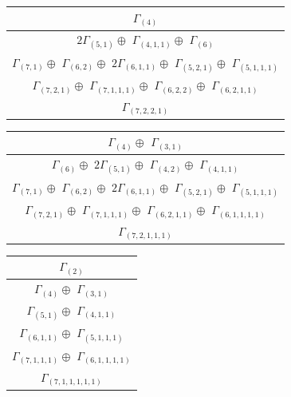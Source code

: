 \documentclass[main.tex]{subfiles}
\begin{document}
\bigskip
\begin{minipage}{.5\textwidth}
\centering
\begin{tabular}{c}
$\Gamma_{(
4
)}$
\\ \hline
$ 2 \Gamma_{(
5 , 
1
)} \oplus$
$\Gamma_{(
4 , 
1 , 
1
)} \oplus$
$\Gamma_{(
6
)}$
\\ \hline
$\Gamma_{(
7 , 
1
)} \oplus$
$\Gamma_{(
6 , 
2
)} \oplus$
$ 2 \Gamma_{(
6 , 
1 , 
1
)} \oplus$
$\Gamma_{(
5 , 
2 , 
1
)} \oplus$
$\Gamma_{(
5 , 
1 , 
1 , 
1
)}$
\\ \hline
$\Gamma_{(
7 , 
2 , 
1
)} \oplus$
$\Gamma_{(
7 , 
1 , 
1 , 
1
)} \oplus$
$\Gamma_{(
6 , 
2 , 
2
)} \oplus$
$\Gamma_{(
6 , 
2 , 
1 , 
1
)}$
\\ \hline
$\Gamma_{(
7 , 
2 , 
2 , 
1
)}$
\\
\end{tabular}\end{minipage}
\begin{minipage}{.5\textwidth}
\centering
\begin{tabular}{c}
$\Gamma_{(
4
)} \oplus$
$\Gamma_{(
3 , 
1
)}$
\\ \hline
$\Gamma_{(
6
)} \oplus$
$ 2 \Gamma_{(
5 , 
1
)} \oplus$
$\Gamma_{(
4 , 
2
)} \oplus$
$\Gamma_{(
4 , 
1 , 
1
)}$
\\ \hline
$\Gamma_{(
7 , 
1
)} \oplus$
$\Gamma_{(
6 , 
2
)} \oplus$
$ 2 \Gamma_{(
6 , 
1 , 
1
)} \oplus$
$\Gamma_{(
5 , 
2 , 
1
)} \oplus$
$\Gamma_{(
5 , 
1 , 
1 , 
1
)}$
\\ \hline
$\Gamma_{(
7 , 
2 , 
1
)} \oplus$
$\Gamma_{(
7 , 
1 , 
1 , 
1
)} \oplus$
$\Gamma_{(
6 , 
2 , 
1 , 
1
)} \oplus$
$\Gamma_{(
6 , 
1 , 
1 , 
1 , 
1
)}$
\\ \hline
$\Gamma_{(
7 , 
2 , 
1 , 
1 , 
1
)}$
\\
\end{tabular}\end{minipage}
\bigskip
\begin{minipage}{.2\textwidth}
\centering
\begin{tabular}{c}
$\Gamma_{(
2
)}$
\\ \hline
$\Gamma_{(
4
)} \oplus$
$\Gamma_{(
3 , 
1
)}$
\\ \hline
$\Gamma_{(
5 , 
1
)} \oplus$
$\Gamma_{(
4 , 
1 , 
1
)}$
\\ \hline
$\Gamma_{(
6 , 
1 , 
1
)} \oplus$
$\Gamma_{(
5 , 
1 , 
1 , 
1
)}$
\\ \hline
$\Gamma_{(
7 , 
1 , 
1 , 
1
)} \oplus$
$\Gamma_{(
6 , 
1 , 
1 , 
1 , 
1
)}$
\\ \hline
$\Gamma_{(
7 , 
1 , 
1 , 
1 , 
1 , 
1
)}$
\\
\end{tabular}\end{minipage}
\end{document}
